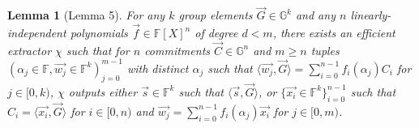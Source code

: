 \documentclass{article}
\newtheorem*{lemma}{Lemma}
\begin{document}
\begin{lemma}[Lemma 5]
	For any $k$ group elements $\vec{G} \in \mathbb{G}^k$ and any $n$ linearly-independent polynomials $\vec{f} \in \mathbb{F}[X]^n$ of degree $d < m$, there exists an efficient extractor $\chi$ such that for $n$ commitments $\vec{C} \in \mathbb{G}^n$ and $m \geq n$ tuples $(\alpha_j \in \mathbb{F}, \vec{w_j} \in \mathbb{F}^k)_{j=0}^{m-1}$ with distinct $\alpha_j$ such that $\langle \vec{w_j}, \vec{G} \rangle = \sum_{i=0}^{n-1} f_i(\alpha_j) C_i$ for $j \in [0, k)$, $\chi$ outputs either $\vec{s} \in \mathbb{F}^k$ such that $\langle \vec{s}, \vec{G} \rangle$, or $\{ \vec{x_i} \in \mathbb{F}^k \}_{i=0}^{n-1}$ such that $C_i = \langle \vec{x_i}, \vec{G} \rangle$ for $i \in [0, n)$ and $\vec{w_j} = \sum_{i=0}^{n-1} f_i(\alpha_j) \vec{x_i}$ for $j \in [0, m)$.
\end{lemma}
\end{document}
